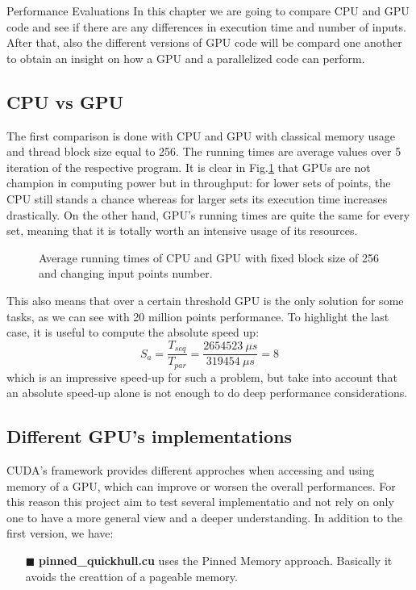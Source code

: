 \documentclass[a4paper,oneside,11pt,DIV12,headsepline,footexclude,headexclude]{scrartcl}
\begin{document}
\begin{section}{Performance Evaluations}
In this chapter we are going to compare CPU and GPU code and see if there are any differences in execution time and number of inputs. After that, also the different versions of GPU code will be compard one another to obtain an insight on how a GPU and a parallelized code can perform.
\subsection{CPU vs GPU}
The first comparison is done with CPU and GPU with classical memory usage and thread block size equal to 256. The running times are average values over 5 iteration of the respective program. It is clear in Fig.\ref{cpuvsgpu} that GPUs are not champion in computing power but in throughput: for lower sets of points, the CPU still stands a chance whereas for larger sets its execution time increases drastically. On the other hand, GPU's running times are quite the same for every set, meaning that it is totally worth an intensive usage of its resources.
\begin{figure}[H]
    \centering
    
    \caption{Average running times of CPU and GPU with fixed block size of 256 and changing input points number.}
    \label{cpuvsgpu}
\end{figure}
This also means that over a certain threshold GPU is the only solution for some tasks, as we can see with 20 million points performance.
To highlight the last case, it is useful to compute the absolute speed up:
\begin{equation*}
    S_{a}=\frac{T_{seq}}{T_{par}}=\frac{2654523\ \mu s}{319454\ \mu s}=8
\end{equation*}
which is an impressive speed-up for such a problem, but take into account that an absolute speed-up alone is not enough to do deep performance considerations.
\subsection{Different GPU's implementations}
CUDA's framework provides different approches when accessing and using memory of a GPU, which can improve or worsen the overall performances. For this reason this project aim to test several implementatio and not rely on only one to have a more general view and a deeper understanding. In addition to the first version, we have:
\begin{enumerate}
    \item[$\blacksquare$] \textbf{pinned\_quickhull.cu} uses the Pinned Memory approach. Basically it avoids the creattion of a pageable memory.


\end{enumerate}
\end{section}
\end{document}
